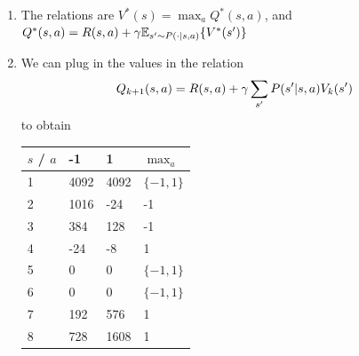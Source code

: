 \begin{solution}
\begin{enumerate}
We give two examples how the values are computed with the formula above:
\begin{align*}
    V_2(s=2) &= \max\[-512 + \g (P(1|2,1)V_1(1) + P(3|2,1)V_1(3)), -512 + \g (P(1|2,-1)V_1(1) + P(3|2,-1)V_1(3))\]\\
             &= \max\[-512 + \frac{1}{2} \frac{3}{4}\cdot 4096, -512 +\frac{1}{2} \frac{1}{4}\cdot 4096\]\\
             &= 1024
\end{align*}
%
\begin{align*}
    V_3(s=2) &= \max\[-512 + \g (P(1|2,1)V_2(1) + P(3|2,1)V_2(3)), -512 + \g (P(1|2,-1)V_2(1) + P(3|2,-1)V_2(3))\]\\
             &= \max\[-512 + \frac{1}{2} \cdot\frac{3}{4}\cdot 4096 + \frac{1}{2}\cdot\frac{1}{4}\cdot(-64),-512 + \frac{1}{2} \cdot\frac{1}{4}\cdot 4096 + \frac{1}{2}\cdot\frac{3}{4}\cdot(-64)\]\\
             &= 1016
\end{align*}

        \item The relations are $V^*(s) = \max_a Q^*(s,a)$, and $Q^*(s,a) = R(s,a) + \g \Exp[s'\sim P(\cdot|s,a)]{V^*(s')}$
        \item We can plug in the values in the relation 
            \begin{equation}
                Q_{k+1}(s,a) = R(s,a) + \g \sum_{s'}P(s'|s,a)V_{k}(s')
            \end{equation}
%
            to obtain
%

\begin{tabular}{l|lll}
    $s$ / $a$ & -1   & 1 & $\max_a$   \\ \hline
    1 & 4092 & 4092 & $\{-1, 1\} $\\
    2 & 1016 & -24 & -1 \\
    3 & 384 & 128 & -1 \\
    4 & -24 & -8 & 1\\
    5 & 0 & 0 & $\{-1, 1\} $\\
    6 & 0  & 0 & $\{-1, 1\} $\\
    7 & 192 & 576  & 1\\
    8 & 728 & 1608 & 1
\end{tabular}
    \end{enumerate}
\end{solution}


